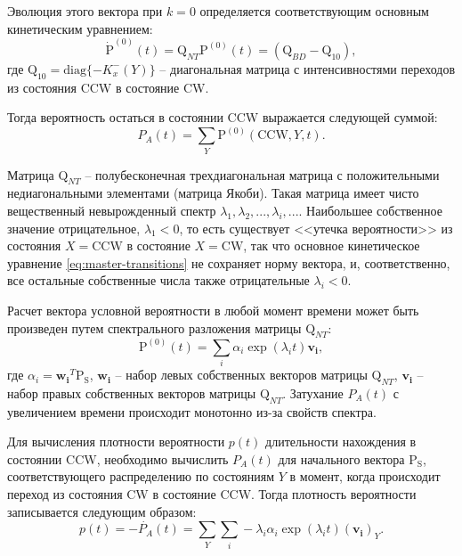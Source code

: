 Эволюция этого вектора при $k=0$ определяется соответствующим основным кинетическим уравнением:
\begin{equation}
    \dot{\boldsymbol{\mathrm{P}}}^{(0)}(t)=\boldsymbol{\mathrm{Q}}_{NT}\mathrm{P}^{(0)}(t) = \left (\boldsymbol{\mathrm{Q}}_{BD} - \boldsymbol{\mathrm{Q}}_{10} \right ),
    \label{eq:conditioned-master-transtions}
\end{equation}
где $\boldsymbol{\mathrm{Q}}_{10} = \mathrm{diag}\{-K^-_x(Y)\}$ -- диагональная матрица с интенсивностями переходов из состояния CCW в состояние CW.

Тогда вероятность остаться в состоянии CCW выражается следующей суммой:
\begin{equation}
    P_A(t) = \sum_Y \mathrm{P}^{(0)}(\mathrm{CCW},Y,t).
    \label{eq:no-transition-prob}
\end{equation}

Матрица $\boldsymbol{\mathrm{Q}}_{NT}$ -- полубесконечная трехдиагональная матрица с положительными недиагональными элементами (матрица Якоби). Такая матрица имеет чисто вещественный невырожденный спектр ${\lambda_1, \lambda_2, ..., \lambda_i, ...}$. Наибольшее собственное значение отрицательное, $\lambda_1 < 0$, то есть существует <<утечка вероятности>> из состояния $X = \mathrm{CCW}$ в состояние $X = \mathrm{CW}$, так что основное кинетическое уравнение \cref{eq:master-transitions} не сохраняет норму вектора, и, соответственно, все остальные собственные числа также отрицательные $\lambda_i < 0$. 

Расчет вектора условной вероятности в любой момент времени может быть произведен путем спектрального разложения матрицы $\boldsymbol{\mathrm{Q}}_{NT}$:
\begin{equation}
    \boldsymbol{\mathrm{P}}^{(0)}(t) = \sum_i \alpha_i \exp(\lambda_i t) \boldsymbol{v_i},
    \label{eq:solution-no-transition-prob}
\end{equation}
где $\alpha_i=\boldsymbol{w_i}^T \boldsymbol{\mathrm{P_S}}$, $\boldsymbol{w_i}$ -- набор левых собственных векторов матрицы $\boldsymbol{\mathrm{Q}}_{NT}$, $\boldsymbol{v_i}$ -- набор правых собственных векторов матрицы $\boldsymbol{\mathrm{Q}}_{NT}$. Затухание $P_A(t)$ с увеличением времени происходит монотонно из-за свойств спектра.

Для вычисления плотности вероятности $p(t)$ длительности нахождения в состоянии CCW, необходимо вычислить $P_A(t)$ для начального вектора $\boldsymbol{\mathrm{P_S}}$, соответствующего распределению по состояниям $Y$ в момент, когда происходит переход из состояния CW в состояние CCW.
Тогда плотность вероятности записывается следующим образом:
\begin{equation}
    p(t) = -\dot{P_A}(t) = \sum_Y \sum_i -\lambda_i \alpha_i \exp(\lambda_i t) (\boldsymbol{v_i})_Y.
    \label{eq:solution-no-transition-pdf}
\end{equation}

